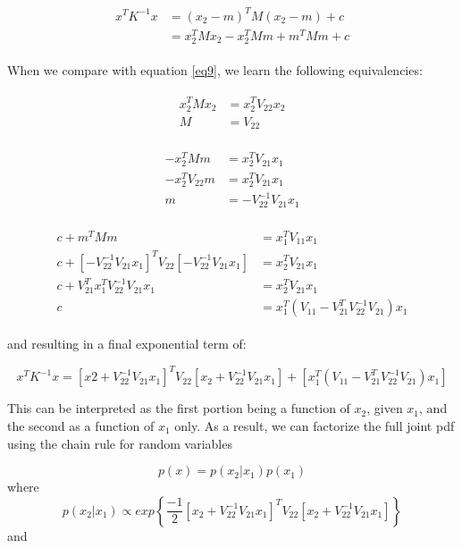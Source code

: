 \begin{align}\label{eq10}
\begin{split}
x^TK^{-1}x & =(x_2-m)^TM(x_2-m) + c \\
& = x_2^TMx_2 - x_2^TMm +m^TMm + c
\end{split}
\end{align}

When we compare with equation \ref{eq9}, we learn the following equivalencies:

\begin{align}\label{eq11}
\begin{split}
x_2^TMx_2 & = x_2^TV_{22}x_2 \\
M & = V_{22}
\end{split}
\end{align}

\begin{align}\label{eq12}
\begin{split}
-x_2^TMm & = x_2^TV_{21}x_1 \\
-x_2^TV_{22}m & = x_2^TV_{21}x_1 \\
m & = -V_{22}^{-1}V_{21}x_1
\end{split}
\end{align}

\begin{align}
\label{eq13}
\begin{split}
c+ m^TMm & = x_1^TV_{11}x_1 \\
c + \left[-V_{22}^{-1}V_{21}x_1\right]^TV_{22}\left[-V_{22}^{-1}V_{21}x_1\right] & = x_2^TV_{21}x_1 \\
c + V_{21}^Tx_1^TV_{22}^{-1}V_{21}x_1 & = x_2^TV_{21}x_1 \\
c & = x_1^T(V_{11}- V_{21}^TV_{22}^{-1}V_{21})x_1
\end{split}
\end{align}

and resulting in a final exponential term of:

\begin{equation}\label{eq14}
x^TK^{-1}x=\left[x2 + V_{22}^{-1}V_{21}x_1\right]^TV_{22}\left[x_2 + V_{22}^{-1}V_{21}x_1\right]+ \left[x_1^T(V_{11}- V_{21}^TV_{22}^{-1}V_{21})x_1\right]
\end{equation}

This can be interpreted as the first portion being a function of $x_2$, given $x_1$, and the second as a function of $x_1$ only. As a result, we can factorize the full joint pdf using the chain rule for random variables

\begin{equation}\label{eq15}
p(x) = p(x_2|x_1)p(x_1)
\end{equation}
where
\begin{equation}\label{eq16}
p(x_2|x_1) \propto exp \left\{ \frac{-1}{2} \left[x_2 + V_{22}^{-1}V_{21}x_1\right]^TV_{22}\left[x_2 + V_{22}^{-1}V_{21}x_1\right]\right\}
\end{equation}
and

